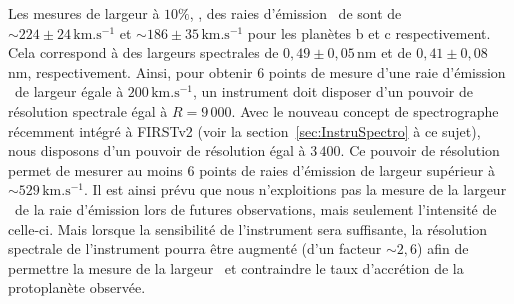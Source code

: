 Les mesures de largeur à $10\%$, \Wd, des raies d'émission \ha~de \cite{haffert2019} sont de $\sim 224 \pm 24 \, \text{km}.\text{s}^{-1}$ et $\sim 186 \pm 35 \, \text{km}.\text{s}^{-1}$ pour les planètes b et c respectivement. Cela correspond à des largeurs spectrales de $0,49 \pm 0,05 \,$nm et de $0,41 \pm 0,08 \,$nm, respectivement. Ainsi, pour obtenir $6$ points de mesure d'une raie d'émission \ha~de largeur égale à $200 \, \text{km}.\text{s}^{-1}$, un instrument doit disposer d'un pouvoir de résolution spectrale égal à $R = 9\,000$. Avec le nouveau concept de spectrographe récemment intégré à \ac{FIRSTv2} (voir la section~\ref{sec:InstruSpectro} à ce sujet), nous disposons d'un pouvoir de résolution égal à $3\,400$. Ce pouvoir de résolution permet de mesurer au moins $6$ points de raies d'émission de largeur supérieur à $\sim 529 \, \text{km}.\text{s}^{-1}$. Il est ainsi prévu que nous n'exploitions pas la mesure de la largeur \Wd~de la raie d'émission lors de futures observations, mais seulement l'intensité de celle-ci. Mais lorsque la sensibilité de l'instrument sera suffisante, la résolution spectrale de l'instrument pourra être augmenté (d'un facteur $\sim 2,6$) afin de permettre la mesure de la largeur \Wd~et contraindre le taux d'accrétion de la protoplanète observée.


